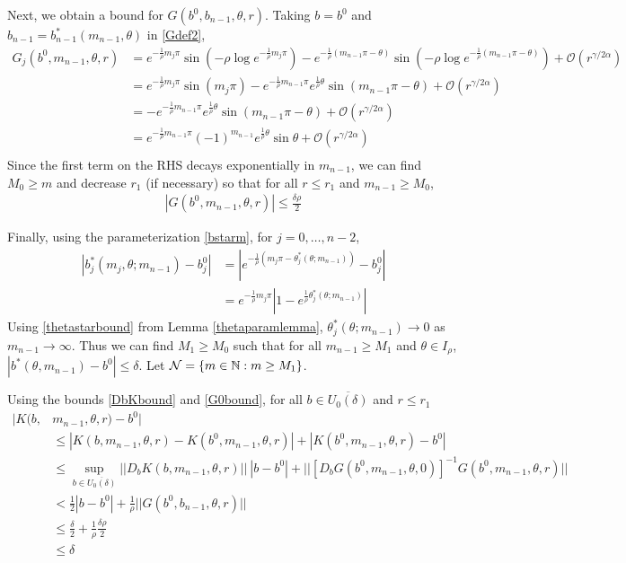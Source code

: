 \documentclass[thesis.tex]{subfiles}
\begin{document}
Next, we obtain a bound for $G(b^0, b_{n-1}, \theta, r)$. Taking $b = b^0$ and $b_{n-1} = b_{n-1}^*(m_{n-1}, \theta)$ in \eqref{Gdef2},
\begin{align*}
G_j(b^0, m_{n-1}, \theta, r) &= e^{-\frac{1}{\rho}m_j \pi} \sin \left( -\rho \log e^{-\frac{1}{\rho}m_j \pi} \right) - e^{-\frac{1}{\rho}(m_{n-1}\pi - \theta)} \sin \left( -\rho \log e^{-\frac{1}{\rho}(m_{n-1}\pi - \theta)} \right) + \mathcal{O}(r^{\gamma / 2 \alpha}) \\
&= e^{-\frac{1}{\rho}m_j \pi} \sin \left( m_j \pi \right) - e^{-\frac{1}{\rho} m_{n-1}\pi } e^{\frac{1}{\rho}\theta } \sin \left(m_{n-1} \pi - \theta \right) + \mathcal{O}(r^{\gamma / 2 \alpha}) \\
&= -e^{-\frac{1}{\rho} m_{n-1}\pi } e^{\frac{1}{\rho}\theta } \sin \left(m_{n-1} \pi - \theta \right) + \mathcal{O}(r^{\gamma / 2 \alpha}) \\
&= e^{-\frac{1}{\rho} m_{n-1}\pi } (-1)^{m_{n-1}} e^{\frac{1}{\rho}\theta } \sin \theta + \mathcal{O}(r^{\gamma / 2 \alpha}) \\
\end{align*}
Since the first term on the RHS decays exponentially in $m_{n-1}$, we can find $M_0 \geq m$ and decrease $r_1$ (if necessary) so that for all $r \leq r_1$ and $m_{n-1} \geq M_0$,
\begin{align}\label{G0bound}
|G(b^0, m_{n-1}, \theta, r)| \leq \frac{\delta \rho}{2}
\end{align}

Finally, using the parameterization \eqref{bstarm}, for $j = 0, \dots, n-2$,
\begin{align*}
| b_j^*(m_j, \theta; m_{n-1}) - b_j^0| &=
| e^{-\frac{1}{\rho}(m_j \pi - \theta_j^*(\theta; m_{n-1}))} - b_j^0 | \\
&= e^{-\frac{1}{\rho}m_j \pi}| 1 - e^{\frac{1}{\rho} \theta_j^*(\theta; m_{n-1})}| 
\end{align*}
Using \eqref{thetastarbound} from Lemma \ref{thetaparamlemma}, $\theta_j^*(\theta; m_{n-1}) \rightarrow 0$ as $m_{n-1} \rightarrow \infty$. Thus we can find $M_1 \geq M_0$ such that for all $m_{n-1} \geq M_1$ and $\theta \in I_\rho$, $|b^*(\theta, m_{n-1}) - b^0| \leq \delta$. Let $\mathcal{N} = \{ m \in {\mathbb N} : m \geq M_1 \}$.

Using the bounds \eqref{DbKbound} and \eqref{G0bound}, for all $b \in \overline{U_0(\delta)}$ and $r \leq r_1$
\begin{align*}
|K(b, &m_{n-1}, \theta, r) - b^0| \\
&\leq |K(b, m_{n-1}, \theta, r) - K(b^0, m_{n-1}, \theta, r)| + |K(b^0, m_{n-1}, \theta, r) - b^0| \\ 
&\leq \sup_{b\in \overline{U_0(\delta)}}||D_b K(b, m_{n-1}, \theta, r)||\:|b - b^0| 
+ || [D_b G(b^0, m_{n-1}, \theta, 0)]^{-1} G(b^0, m_{n-1}, \theta, r) || \\
&< \frac{1}{2} |b - b^0| + \frac{1}{\rho} ||G(b^0, b_{n-1}, \theta, r) ||  \\
&\leq \frac{\delta}{2} + \frac{1}{\rho}\frac{\delta \rho}{2} \\
&\leq \delta
\end{align*} 
\end{document}
